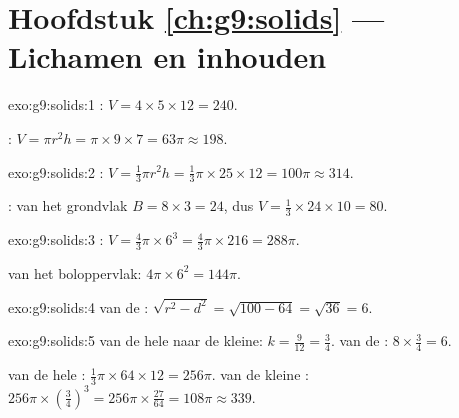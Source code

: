 \section*{Hoofdstuk \ref{ch:g9:solids} --- Lichamen en inhouden}

\begin{solution}{exo:g9:solids:1}
: $V = 4 \times 5 \times 12 = 240$.

: $V = \pi r^2 h = \pi \times 9 \times 7 = 63\pi \approx 198$.
\end{solution}

\begin{solution}{exo:g9:solids:2}
: $V = \frac13 \pi r^2 h = \frac13 \pi \times 25 \times 12 = 100\pi
\approx 314$.

:  van het grondvlak $B = 8 \times 3 = 24$, dus
$V = \frac13 \times 24 \times 10 = 80$.
\end{solution}

\begin{solution}{exo:g9:solids:3}
: $V = \frac43 \pi \times 6^3 = \frac43 \pi \times 216 = 288\pi$.

 van het boloppervlak: $4\pi \times 6^2 = 144\pi$.
\end{solution}

\begin{solution}{exo:g9:solids:4}
 van de : $\sqrt{r^2 - d^2} = \sqrt{100 - 64} = \sqrt{36} = 6$.
\end{solution}

\begin{solution}{exo:g9:solids:5}
 van de hele  naar de kleine: $k = \frac{9}{12} = \frac34$.
 van de : $8 \times \frac34 = 6$.

 van de hele : $\frac13\pi \times 64 \times 12 = 256\pi$.  van de
kleine : $256\pi \times \left(\frac34\right)^3 = 256\pi \times \frac{27}{64}
= 108\pi \approx 339$.
\end{solution}

